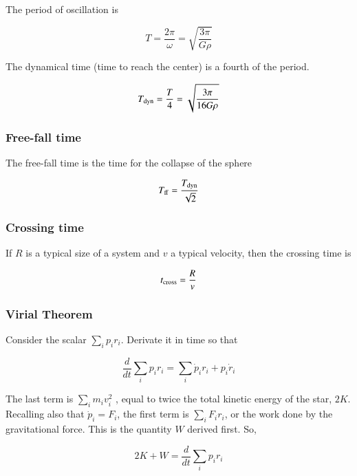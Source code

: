 The period of oscillation is 

\begin{equation}
T = \frac{2\pi}{\omega}  = \sqrt{\frac{3\pi}{G\rho}}
\end{equation}

The dynamical time (time to reach the center) is a fourth of the period. 


\begin{equation}
T_{\rm dyn}  = \frac{T}{4}  = \sqrt{\frac{3\pi}{16G\rho}}
\end{equation}

\subsubsection{Free-fall time} 

The free-fall time is the time for the collapse of the sphere

\begin{equation}
T_{\rm ff}  = \frac{T_{\rm dyn}}{\sqrt{2}} 
\end{equation}

\subsubsection{Crossing time} 

If $R$ is a typical size of a system and $v$ a typical velocity, then the crossing time is 

\begin{equation}
t_{\rm cross}  = \frac{R}{v} 
\end{equation}

\subsubsection{Virial Theorem}

Consider the scalar $\sum_i p_i r_i$. Derivate it in time so that 

\begin{equation}
\frac{d}{dt} \sum_i p_i r_i = \sum_i \dot{p}_i r_i + p_i \dot{r}_i
\end{equation}

The last term is $\sum_i m_i v^2_i$ , equal to twice the total kinetic
energy of the star, $2K$. Recalling also that $\dot{p}_i = F_i$, the
first term is $\sum_i F_i r_i$, or the work done by the
gravitational force. This is the quantity $W$ derived first. So, 

\begin{equation}
2K + W = \frac{d}{dt}\sum_i p_i r_i 
\end{equation}

